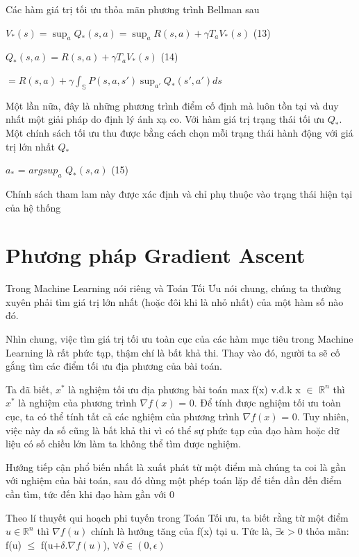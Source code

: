 \documentclass[14pt]{extreport}
\begin{document}
 Các hàm giá trị tối ưu thỏa mãn phương trình Bellman sau
 
 \begin{center}
 $V_* (s)= \sup _a Q_* (s,a)=\sup _a {R(s,a)+\gamma T_a V_* (s)}$ (13)
 
 $Q_*(s,a)=R(s,a)+\gamma T_a V_* (s)$ (14)
 
 $=R(s,a)+\gamma \int _{\mathbb{S}}P(s,a,s') \sup _{a'} Q_*(s',a')ds$
\end{center}

Một lần nữa, đây là những phương trình điểm cố định mà luôn tồn tại và duy nhất một giải pháp do định lý ánh xạ co. Với hàm giá trị trạng thái tối ưu $Q_*$. Một chính sách tối ưu thu được bằng cách chọn mỗi trạng thái hành động với giá trị lớn nhất $Q_*$

\begin{center}
$a_*$ = $argsup_{a}$  $Q_*(s,a)$ (15)
\end{center}

Chính sách tham lam này được xác định và chỉ phụ thuộc vào trạng thái hiện tại của hệ thống

\section{Phương pháp Gradient Ascent}
Trong Machine Learning nói riêng và Toán Tối Ưu nói chung, chúng ta thường xuyên phải tìm giá trị lớn nhất (hoặc đôi khi là nhỏ nhất) của một hàm số nào đó.

Nhìn chung, việc tìm giá trị tối ưu toàn cục của các hàm mục tiêu trong Machine Learning là rất phức tạp, thậm chí là bất khả thi. Thay vào đó, người ta sẽ cố gắng tìm các điểm tối ưu địa phương của bài toán.

Ta đã biết, $x^*$ là nghiệm tối ưu địa phương bài toán max f(x) v.đ.k x $\in$ $\mathbb{R}^n$ thì $x^*$ là nghiệm của phương trình $\nabla f(x)$ = 0. Để tính được nghiệm tối ưu toàn cục, ta có thể tính tất cả các nghiệm của phương trình $\nabla f(x)$ = 0. Tuy nhiên, việc này đa số cũng là bất khả thi vì có thể sự phức tạp của đạo hàm hoặc dữ liệu có số chiều lớn làm ta không thể tìm được nghiệm.

Hướng tiếp cận phổ biến nhất là xuất phát từ một điểm mà chúng ta coi là gần với nghiệm của bài toán, sau đó dùng một phép toán lặp để tiến dần đến điểm cần tìm, tức đến khi đạo hàm gần với 0

Theo lí thuyết qui hoạch phi tuyến trong Toán Tối ưu, ta biết rằng từ một điểm $u \in \mathbb{R}^n$ thì $\nabla f(u)$ chính là hướng tăng của f(x) tại u. Tức là, $\exists \epsilon >0$ thỏa mãn: f(u) $\leq$ f(u+$\delta.\nabla f(u)$), $\forall \delta \in (0, \epsilon)$
\end{document}
